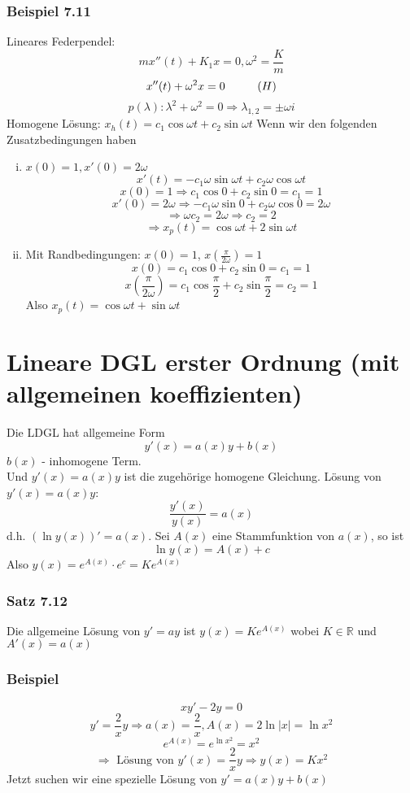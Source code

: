 \subsubsection*{Beispiel 7.11}
Lineares Federpendel:
$$mx''(t)+K_1x=0, \omega^2=\frac{K}{m}$$
$$x''(t)+\omega^2x=0\hspace{10mm}(H)$$
$$p(\lambda):\lambda^2+\omega^2=0\Rightarrow\lambda_{1,2}=\pm\omega i$$
Homogene Lösung: $x_h(t)=c_1\cos\omega t+c_2\sin\omega t$
Wenn wir den folgenden Zusatzbedingungen haben
\begin{enumerate}[(i)]
\item $x(0)=1, x'(0)=2\omega$
$$x'(t)=-c_1\omega\sin\omega t+c_2\omega\cos\omega t$$
$$x(0)=1\Rightarrow c_1\cos 0+c_2\sin 0=c_1=1$$
$$x'(0)=2\omega\Rightarrow-c_1\omega\sin 0+c_2\omega\cos 0=2\omega$$$$\Rightarrow \omega c_2=2\omega\Rightarrow c_2=2$$
$$\Rightarrow x_p(t)=\cos\omega t+2\sin\omega t$$
\item Mit Randbedingungen: $x(0)=1$, $x\left(\frac{\pi}{2\omega}\right)=1$
$$x(0)=c_1\cos 0+c_2\sin 0=c_1=1$$
$$x\left(\frac{\pi}{2\omega}\right)=c_1\cos\frac{\pi}{2}+c_2\sin\frac{\pi}{2}=c_2=1$$
Also $x_p(t)=\cos\omega t+\sin\omega t$
\end{enumerate}

\section{Lineare DGL erster Ordnung (mit allgemeinen koeffizienten)}
Die LDGL hat allgemeine Form $$y'(x)=a(x)y+b(x)$$ $b(x)$ - inhomogene Term.\\

\noindent Und $y'(x)=a(x)y$ ist die zugehörige homogene Gleichung. Lösung von $y'(x)=a(x)y$: $$\frac{y'(x)}{y(x)}=a(x)$$
d.h. $\left( \ln y(x)\right)'=a(x)$. Sei $A(x)$ eine Stammfunktion von $a(x)$, so ist $$\ln y(x)=A(x)+c$$ Also $y(x)=e^{A(x)}\cdot e^c=Ke^{A(x)}$
\subsubsection*{Satz 7.12} 
Die allgemeine Lösung von $y'=ay$ ist $y(x)=Ke^{A(x)}$ wobei $K\in\mathbb{R}$ und $A'(x)=a(x)$
\subsubsection*{Beispiel}
$$xy'-2y=0$$
$$y'=\frac{2}{x}y\Rightarrow a(x)=\frac{2}{x}, A(x)=2\ln\left|x\right|=\ln x^2$$
$$e^{A(x)}=e^{\ln x^2}=x^2$$
$$\Rightarrow\text{ Lösung von }y'(x)=\frac{2}{x}y \Rightarrow y(x)=Kx^2$$
Jetzt suchen wir eine spezielle Lösung von $y'=a(x)y+b(x)$ 

